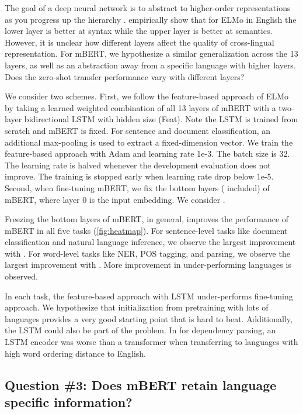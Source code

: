 \documentclass[11pt,a4paper]{article}
\begin{document}
The goal of a deep neural network is to abstract to higher-order representations as you progress up the hierarchy \cite{yosinski2014transferable}.  empirically show that for ELMo in English the lower layer is better at syntax while the upper layer is better at semantics. However, it is unclear how different layers affect the quality of cross-lingual representation. For mBERT, we hypothesize a similar generalization across the 13 layers, as well as an abstraction away from a specific language with higher layers. Does the zero-shot transfer performance vary with different layers?

We consider two schemes. First, we follow the feature-based approach of ELMo by taking a learned weighted combination of all 13 layers of mBERT with a two-layer bidirectional LSTM with  hidden size (Feat). Note the LSTM is trained from scratch and mBERT is fixed. For sentence and document classification, an additional max-pooling is used to extract a fixed-dimension vector. We train the feature-based approach with Adam and learning rate 1e-3. The batch size is 32. The learning rate is halved whenever the development evaluation does not improve. The training is stopped early when learning rate drop below 1e-5. Second, when fine-tuning mBERT, we fix the bottom  layers ( included) of mBERT, where layer 0 is the input embedding. We consider .

Freezing the bottom layers of mBERT, in general, improves the performance of mBERT in all five tasks (\cref{fig:heatmap}). For sentence-level tasks like document classification and natural language inference, we observe the largest improvement with . For word-level tasks like NER, POS tagging, and parsing, we observe the largest improvement with . More improvement in under-performing languages is observed.

In each task, the feature-based approach with LSTM under-performs fine-tuning approach. We hypothesize that
initialization from pretraining with lots of languages provides a very good starting point that is hard to beat. Additionally, the LSTM could also be part of the problem. In \citet{ahmad-etal-2019-difficulties} for dependency parsing, an LSTM encoder was worse than a transformer when transferring to languages with high word ordering distance to English.

\subsection{Question \#3: Does mBERT retain language specific information?}\label{sec:exp3}
\end{document}
